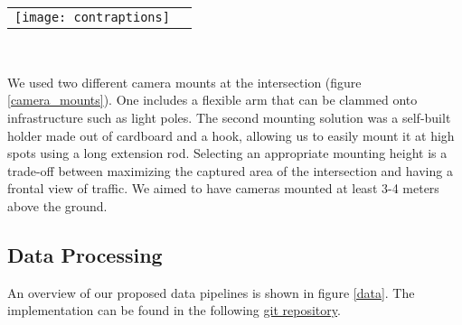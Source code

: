 \ \\





\ \\ 
\raggedbottom
\begin{tabular}{@{}cc}
\texttt{[image: contraptions]}
\end{tabular}
\label{camera_mounts}
\

We used two different camera mounts at the intersection (figure \ref{camera_mounts}). One includes a flexible arm that can be clammed onto infrastructure such as light poles.
The second mounting solution was a self-built holder made out of cardboard and a hook, allowing us to easily mount it at high spots using a long extension rod.
Selecting an appropriate mounting height is a trade-off between maximizing the captured area of the intersection and having a frontal view of traffic.
We aimed to have cameras mounted at least 3-4 meters above the ground.

\subsection{Data Processing}
An overview of our proposed data pipelines is shown in figure \ref{data}. 
The implementation can be found in the following \href{https://github.com/edibegovic/cyclist-behaviourCPH-2021}{git repository}.

